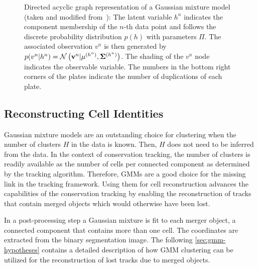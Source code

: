 \begin{figure}
    \centering
    
    \caption[GMM: Directed acyclic graph representation]{Directed acyclic graph representation of a
        Gaussian mixture model (taken and modified from~\cite{wikipedia_12_gmm}): The latent
        variable $h^n$ indicates the component membership of the $n$-th data point and follows the
        discrete probability distribution $p(h)$ with parameters $\Pi$. The associated observation
        $v^n$ is then generated by $p(v^n|h^n)=\mathcal{N}\left(\mathbf{v}^n|\mathbf{\mu}^{(h^n)} ,
            \mathbf{\Sigma}^{(h^n)}\right)$. The shading of the $v^n$ node indicates the observable
        variable. The numbers in the bottom right corners of the plates indicate the number of
        duplications of each plate.}
    \label{fig:gmm-gm-plate}
\end{figure}


\subsection{Reconstructing Cell Identities}
Gaussian mixture models are an outstanding choice for clustering when the number of clusters $H$ in
the data is known. Then, $H$ does not need to be inferred from the data. In the context of
conservation tracking, the number of clusters is readily available as the number of cells per
connected component as determined by the tracking algorithm. Therefore, GMMs are a good choice for
the missing link in the tracking framework. Using them for cell reconstruction advances the
capabilities of the conservation tracking by enabling the reconstruction of tracks that contain
merged objects which would otherwise have been lost.

In a post-processing step a Gaussian mixture is fit to each merger object, \ie a connected component
that contains more than one cell. The coordinates are extracted from the binary segmentation
image.
%
The following \cref{sec:gmm-hypotheses} contains a detailed description of how GMM clustering
can be utilized for the reconstruction of lost tracks due to merged objects.
